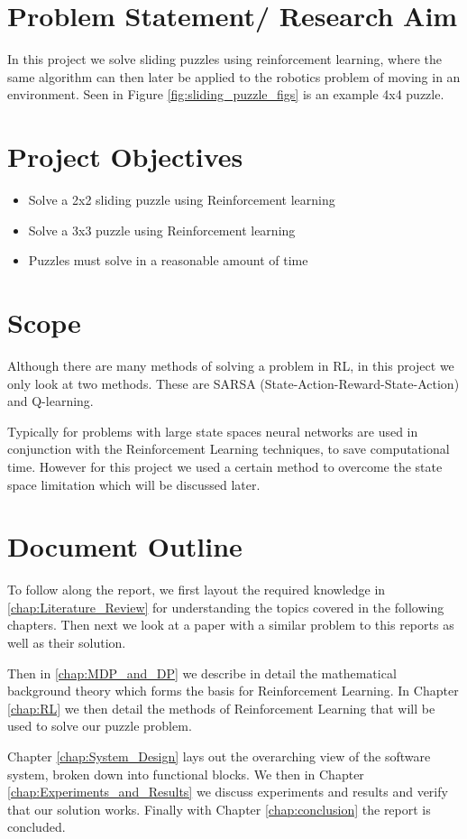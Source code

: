 \section{Problem Statement/ Research Aim}
In this project
we solve sliding puzzles using
reinforcement learning, where the same algorithm can then later be applied to the robotics problem of moving in an environment. Seen in Figure \ref{fig:sliding_puzzle_figs} is an example 4x4 puzzle.

\section{Project Objectives}
\begin{itemize}
	\item Solve a 2x2 sliding puzzle using Reinforcement learning
	\item Solve a 3x3 puzzle using Reinforcement learning
	\item Puzzles must solve in a reasonable amount of time
\end{itemize}

\section{Scope}
Although there are many methods of solving a problem in RL, in this project we only look at two methods. These are SARSA (State-Action-Reward-State-Action) and Q-learning. 

Typically for problems with large state spaces neural networks are used in conjunction with the Reinforcement Learning techniques, to save computational time. However for this project we used a certain method to overcome the state space limitation which will be discussed later.

\section{Document Outline}
To follow along the report, we first layout the required knowledge in \ref{chap:Literature_Review} for understanding the topics covered in the following chapters. Then next we look at a paper with a similar problem to this reports as well as their solution.

Then in \ref{chap:MDP_and_DP} we describe in detail the mathematical background theory which forms the basis for Reinforcement Learning. In Chapter \ref{chap:RL} we then detail the methods of Reinforcement Learning that will be used to solve our puzzle problem.

Chapter \ref{chap:System_Design} lays out the overarching view of the software system, broken down into functional blocks.
We then in Chapter \ref{chap:Experiments_and_Results} we discuss experiments and results and verify that our solution works. Finally with Chapter \ref{chap:conclusion} the report is concluded.